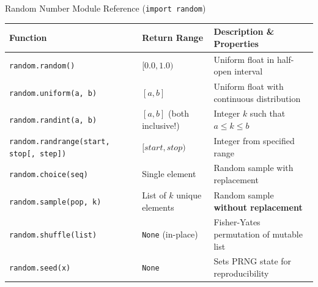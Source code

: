 \begin{formulabox}{Random Number Module Reference (\texttt{import random})}
\begin{center}
\begin{tabularx}{0.96\textwidth}{l p{5cm} X}
\toprule
\textbf{Function} & \textbf{Return Range} & \textbf{Description \& Properties} \\
\midrule
\texttt{random.random()} & $[0.0, 1.0)$ & Uniform float in half-open interval \\
\texttt{random.uniform(a, b)} & $[a, b]$ & Uniform float with continuous distribution \\
\texttt{random.randint(a, b)} & $[a, b]$ (both inclusive!) & Integer $k$ such that $a \le k \le b$ \\
\texttt{random.randrange(start, stop[, step])} & $[start, stop)$ & Integer from specified range \\
\texttt{random.choice(seq)} & Single element & Random sample with replacement \\
\texttt{random.sample(pop, k)} & List of $k$ unique elements & Random sample \textbf{without replacement} \\
\texttt{random.shuffle(list)} & \texttt{None} (in-place) & Fisher-Yates permutation of mutable list \\
\texttt{random.seed(x)} & \texttt{None} & Sets PRNG state for reproducibility \\
\bottomrule
\end{tabularx}
\end{center}
\end{formulabox}

